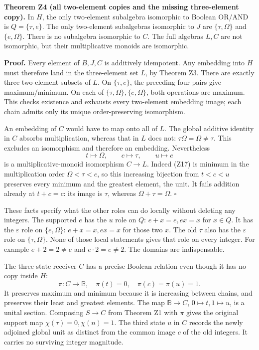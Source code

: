 \documentclass[
]{article}
\begin{document}
\textbf{Theorem Z4 (all two-element copies and the missing three-element
copy).} In \(H\), the only two-element subalgebra isomorphic to Boolean
OR/AND is \(Q=\{\tau,e\}\). The only two-element subalgebras isomorphic
to \(J\) are \(\{\tau,\Omega\}\) and \(\{e,\Omega\}\). There is no
subalgebra isomorphic to \(C\). The full algebras \(L,C\) are not
isomorphic, but their multiplicative monoids are isomorphic.

\textbf{Proof.} Every element of \(B,J,C\) is additively idempotent. Any
embedding into \(H\) must therefore land in the three-element set \(L\),
by Theorem Z3. There are exactly three two-element subsets of \(L\). On
\(\{\tau,e\}\), the preceding four pairs give maximum/minimum. On each
of \(\{\tau,\Omega\},\{e,\Omega\}\), both operations are maximum. This
checks existence and exhausts every two-element embedding image; each
chain admits only its unique order-preserving isomorphism.

An embedding of \(C\) would have to map onto all of \(L\). The global
additive identity in \(C\) absorbs multiplication, whereas that in \(L\)
does not: \(\tau\Omega=\Omega\ne\tau\). This excludes an isomorphism and
therefore an embedding. Nevertheless \[
t\mapsto\Omega,\qquad c\mapsto\tau,\qquad u\mapsto e
\tag{Z19}
\] is a multiplicative-monoid isomorphism \(C\to L\). Indeed (Z17) is
minimum in the multiplication order \(\Omega<\tau<e\), so this
increasing bijection from \(t<c<u\) preserves every minimum and the
greatest element, the unit. It fails addition already at \(t+c=c\): its
image is \(\tau\), whereas \(\Omega+\tau=\Omega\). \(\square\)

These facts specify what the other roles can do locally without deleting
any integers. The supported \(e\) has the \(u\) role on \(Q\):
\(e+x=e,ex=x\) for \(x\in Q\). It has the \(\varepsilon\) role on
\(\{e,\Omega\}\): \(e+x=x,ex=x\) for those two \(x\). The old \(\tau\)
also has the \(\varepsilon\) role on \(\{\tau,\Omega\}\). None of those
local statements gives that role on every integer. For example
\(e+2=2\ne e\) and \(e\cdot2=e\ne2\). The domains are indispensable.

The three-state receiver \(C\) has a precise Boolean relation even
though it has no copy inside \(H\): \[
\pi:C\to\mathbb B,\quad \pi(t)=0,\quad\pi(c)=\pi(u)=1.
\tag{Z20}
\] It preserves maximum and minimum because it is increasing between
chains, and preserves their least and greatest elements. The map
\(\mathbb B\to C\), \(0\mapsto t,1\mapsto u\), is a unital section.
Composing \(S\to C\) from Theorem Z1 with \(\pi\) gives the original
support map \(\chi(\tau)=0,\chi(n)=1\). The third state \(u\) in \(C\)
records the newly adjoined global unit as distinct from the common image
\(c\) of the old integers. It carries no surviving integer magnitude.
\end{document}
